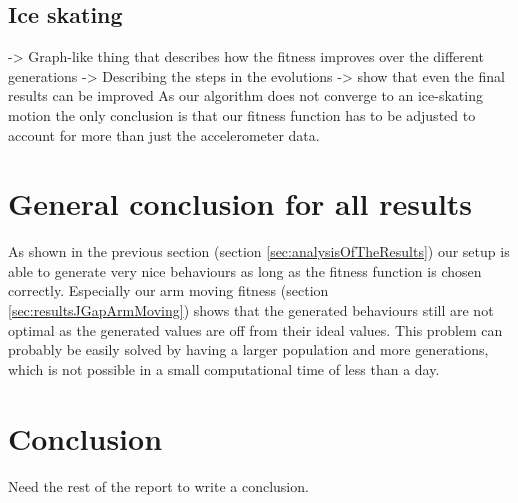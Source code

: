 \documentclass[a4paper,10pt]{article}
\begin{document}
\subsection{Ice skating}
-> Graph-like thing that describes how the fitness improves over the different generations
-> Describing the steps in the evolutions -> show that even the final results can be improved
As our algorithm does not converge to an ice-skating motion the only conclusion is that our fitness function has to be adjusted to account for more than just the accelerometer data. 


\section{General conclusion for all results}
As shown in the previous section (section \ref{sec:analysisOfTheResults}) our setup is able to generate very nice behaviours as long as the fitness function is chosen correctly. Especially our arm moving fitness (section \ref{sec:resultsJGapArmMoving}) shows that the generated behaviours still are not optimal as the generated values are off from their ideal values. This problem can probably be easily solved by having a larger population and more generations, which is not possible in a small computational time of less than a day. 


\section{Conclusion}
\label{sec:conclusion}
Need the rest of the report to write a conclusion.




\end{document}
